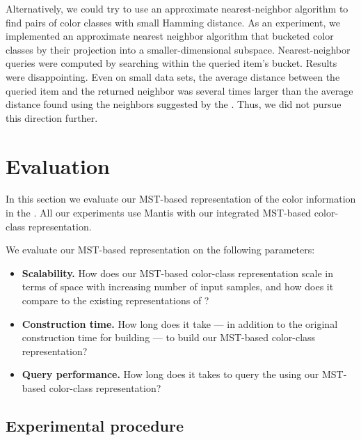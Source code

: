 Alternatively, we could try to use an approximate nearest-neighbor
algorithm to find pairs of color classes with small Hamming distance.
As an experiment, we implemented an approximate nearest neighbor
algorithm that bucketed color classes by their projection into
a smaller-dimensional subspace.  Nearest-neighbor queries were
computed by searching within the queried item's bucket.
Results were disappointing.  Even on small data sets, the average
distance between the queried item and the returned neighbor
was several times larger than the average distance found using
the neighbors suggested by the \dbg.  Thus, we did not pursue
this direction further.

\section{Evaluation}
\label{sec:mantis_eval}

In this section we evaluate our MST-based representation of the color
information in the \cdbg.  All our experiments use Mantis with
our integrated MST-based color-class representation.


We evaluate our MST-based representation on the following parameters:
\begin{itemize}
    \item \textbf{Scalability.} How does our MST-based color-class representation
    scale in terms of space with increasing number of input samples, and how does
    it compare to the existing representations of \mantis?

    \item \textbf{Construction time.} How long does it take --- in addition to
    the original construction time for building \cdbg --- to build
    our MST-based color-class representation?

    \item \textbf{Query performance.} How long does it takes to query the \cdbg
    using our MST-based color-class representation?
\end{itemize}
\subsection{Experimental procedure}

\label{experimental-proc}


